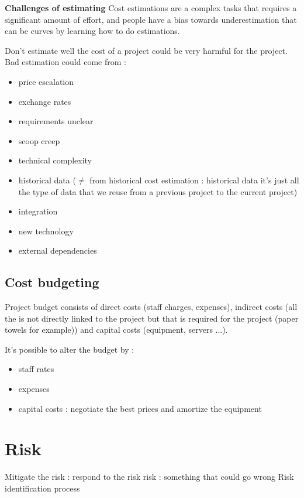 \documentclass{article}
\begin{document}
\noindent\textbf{Challenges of estimating}\newline
Cost estimations are a complex tasks that requires a significant amount of effort, and people have a bias towards underestimation that can be curves by learning how to do estimations.\newline

Don't estimate well the cost of a project could be very harmful for the project. Bad estimation could come from :
\begin{itemize}
	\item price escalation
	\item exchange rates
	\item requirements unclear
	\item scoop creep
	\item technical complexity
	\item historical data ($\neq$ from historical cost estimation : historical data it's just all the type of data that we reuse from a previous project to the current project)
	\item integration
	\item new technology
	\item external dependencies
\end{itemize}

\subsection{Cost budgeting}
Project budget consists of direct costs (staff charges, expenses), indirect costs (all the is not directly linked to the project but that is required for the project (paper towels for example)) and capital costs (equipment, servers ...).\newline
\newline

It's possible to alter the budget by :
\begin{itemize}
	\item staff rates
	\item expenses
	\item capital costs : negotiate the best prices and amortize the equipment
\end{itemize}

\newpage
\section{Risk}
Mitigate the risk : respond to the risk\newline
\noindent risk : something that could go wrong
\newline
\noindent Risk identification process
\end{document}
